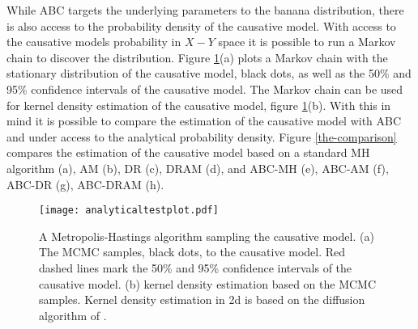 While ABC targets the underlying parameters to the banana distribution, there is also access to the probability density of the causative model. With access to the causative models probability in $X-Y$ space it is possible to run a Markov chain to discover the distribution. Figure \ref{Analytical-banana}(a) plots a Markov chain with the stationary distribution of the causative model, black dots, as well as the 50\% and 95\% confidence intervals of the causative model. The Markov chain can be used for kernel density estimation of the causative model, figure \ref{Analytical-banana}(b). With this in mind it is possible to compare the estimation of the causative model with ABC and under access to the analytical probability density. Figure \ref{the-comparison} compares the estimation of the causative model based on a standard MH algorithm (a), AM (b), DR (c), DRAM (d), and ABC-MH (e), ABC-AM (f), ABC-DR (g), ABC-DRAM (h). 

\begin{figure}[H]
\centering
\texttt{[image: analyticaltestplot.pdf]}
\caption{A Metropolis-Hastings algorithm sampling the causative model. (a) The MCMC samples, black dots, to the causative model. Red dashed lines mark the 50\% and 95\% confidence intervals of the causative model. (b) kernel density estimation based on the MCMC samples. Kernel density estimation in 2d is based on the diffusion algorithm of \citet{Botev2010}.}
\label{Analytical-banana}
\end{figure}

